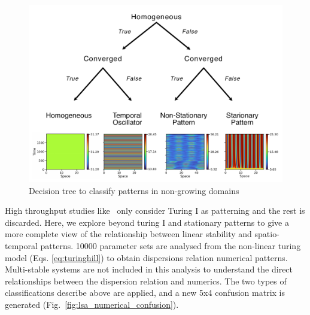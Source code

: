 \begin{figure}[H] %
    \centering
    \begin{adjustbox}{center}
    \includegraphics[width=1.2\textwidth]{chapters/Chapter 1/no growth classification} %
    \end{adjustbox}
    \caption{Decision tree to classify patterns in non-growing domains}
    \label{fig:no growth classification} %
\end{figure}


High throughput studies like~\cite{Scholes2019, Zheng2016, Marcon} only consider Turing I as patterning and the rest is discarded.
Here, we explore beyond turing I and stationary patterns to give a more complete view of the relationship between linear stability and spatio-temporal patterns.
10000 parameter sets are analysed from the non-linear turing model (Eqs. \eqref{eq:turinghill}) to obtain dispersions relation numerical patterns.
Multi-stable systems are not included in this analysis to understand the direct relationships between the dispersion relation and numerics.
The two types of classifications describe above are applied, and a new 5x4 confusion matrix is generated (Fig.~\ref{fig:lsa_numerical_confusion}).  %

